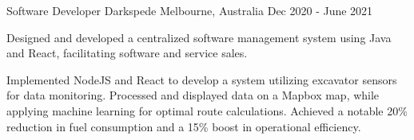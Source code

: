 \begin{cventries}
  \cventry
    {Software Developer} %
    {Darkspede} %
    {Melbourne, Australia} %
    {Dec 2020 - June 2021} %
    {
      \begin{cvitems} %
        \item Designed and developed a centralized software management system using Java and React, facilitating software and service sales. 
        \item Implemented NodeJS and React to develop a system utilizing excavator sensors for data monitoring. Processed and displayed data on a Mapbox map, while applying machine learning for optimal route calculations. Achieved a notable 20\% reduction in fuel consumption and a 15\% boost in operational efficiency.
      \end{cvitems}
    }
















\end{cventries}
